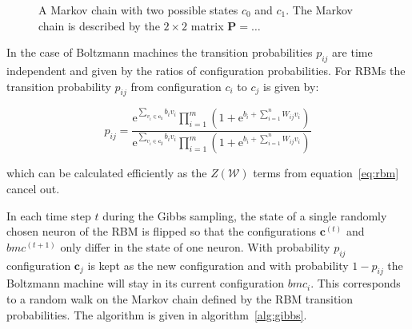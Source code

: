 \begin{figure}[H]
    \label{fig:markov}
    \centering
    \caption{A Markov chain with two possible states $c_0$ and $c_1$. The Markov chain is 
described by the $2 \times 2$ matrix $\bm{P}=\dots$}
\end{figure}

In the case of Boltzmann machines the transition probabilities $p_{ij}$ are time independent and 
given by the ratios of configuration probabilities. For RBMs the transition probability $p_{ij}$ 
from configuration $c_i$ to $c_j$ is given by:

\begin{equation}
    p_{ij} = \frac{\mathrm{e}^{\sum_{v_i \in \bm{c_i}}b_iv_i}\prod_{i=1}^m(1+\mathrm{e}^{b_i + \sum_{i=1}^nW_{ij}v_i})}{\mathrm{e}^{\sum_{v_i \in \bm{c_j}}b_iv_i}\prod_{i=1}^m(1+\mathrm{e}^{b_i + \sum_{i=1}^nW_{ij}v_i})}
\end{equation}

which can be calculated efficiently as the $Z(\mathcal{W})$ terms from equation~\ref{eq:rbm} cancel out.

In each time step $t$ during the Gibbs sampling, the state of a single randomly chosen neuron of the RBM is flipped
so that the configurations $\bm{c}^{(t)}$ and $bm{c}^{(t+1)}$ only differ in the state of one neuron. With 
probability $p_{ij}$ configuration $\bm{c}_j$ is kept as the new configuration and with probability
$1-p_{ij}$ the Boltzmann machine will stay in its current configuration $bm{c}_i$. This corresponds to 
a random walk on the Markov chain defined by the RBM transition probabilities. The algorithm is given in 
algorithm~\ref{alg:gibbs}.

